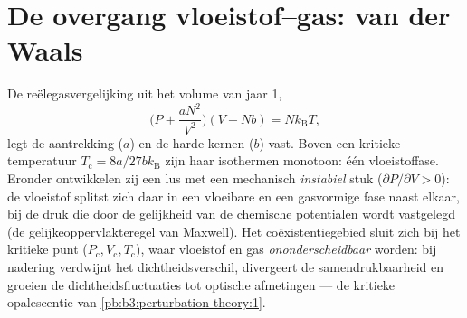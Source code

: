 \section{De overgang vloeistof--gas: van der Waals}

\begin{proposition}\label{prop:b3:phase-transitions:vdw}
De reëlegasvergelijking uit het volume van jaar 1,
\[
\Big(P + \frac{aN^2}{V^2}\Big)(V - Nb) = Nk_{\text{B}}T ,
\]
legt de aantrekking ($a$) en de harde kernen ($b$) vast. Boven een
kritieke temperatuur $T_{\text{c}} = 8a/27bk_{\text{B}}$ zijn haar
isothermen monotoon: één vloeistoffase. Eronder ontwikkelen zij een
lus met een mechanisch \emph{instabiel} stuk ($\partial P/\partial V >
0$): de vloeistof splitst zich daar in een vloeibare en een
gasvormige fase naast elkaar, bij de druk die door de gelijkheid van
de chemische potentialen wordt vastgelegd (de gelijkeoppervlakteregel
van Maxwell). Het coëxistentiegebied sluit zich bij het kritieke
punt ($P_{\text{c}}, V_{\text{c}}, T_{\text{c}}$), waar vloeistof
en gas \emph{ononderscheidbaar} worden: bij nadering verdwijnt het
dichtheidsverschil, divergeert de samendrukbaarheid en groeien de
dichtheidsfluctuaties tot optische afmetingen --- de kritieke
opalescentie van \cref{pb:b3:perturbation-theory:1}.
\end{proposition}
\admitted

